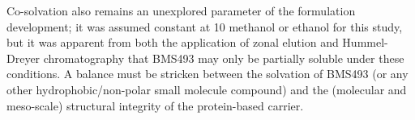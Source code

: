 \begin{refsection}
Co-solvation also remains an unexplored parameter of the formulation
development; it was assumed constant at \SI{10}{\volper} methanol or ethanol for
this study, but it was apparent from both the application of zonal elution and
Hummel-Dreyer chromatography that BMS493 may only be partially soluble under
these conditions. A balance must be stricken between the solvation of BMS493 (or
any other hydrophobic/non-polar small molecule compound) and the (molecular and
meso-scale) structural integrity of the protein-based carrier.

\printbibliography[heading=subbibliography]

\end{refsection}
